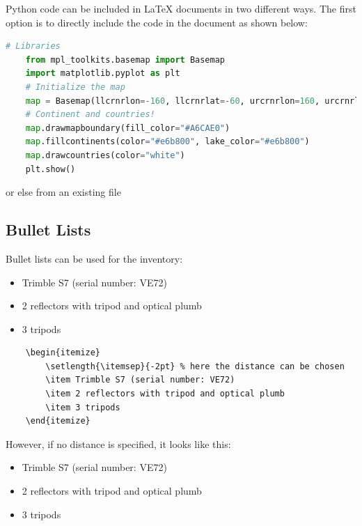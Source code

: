 Python code can be included in \LaTeX{} documents in two different ways. The first option is to directly include the code in the document as shown below:

\begin{lstlisting}[language=Python, style=Python, caption=Basemap-Anwendung, label={lst:basemap}]
	# Libraries
	from mpl_toolkits.basemap import Basemap
	import matplotlib.pyplot as plt
	# Initialize the map
	map = Basemap(llcrnrlon=-160, llcrnrlat=-60, urcrnrlon=160, urcrnrlat=70)
	# Continent and countries!
	map.drawmapboundary(fill_color="#A6CAE0")
	map.fillcontinents(color="#e6b800", lake_color="#e6b800")
	map.drawcountries(color="white")
	plt.show()
\end{lstlisting} 

or else from an existing file




\subsection{Bullet Lists}

Bullet lists can be used for the inventory:

\begin{itemize}	
	\setlength{\itemsep}{-2pt} %
	\item Trimble S7 (serial number: VE72)
	\item 2 reflectors with tripod and optical plumb
	\item 3 tripods
\end{itemize}

\begin{verbatim}
    \begin{itemize}	
    	\setlength{\itemsep}{-2pt} % here the distance can be chosen
    	\item Trimble S7 (serial number: VE72)
    	\item 2 reflectors with tripod and optical plumb
    	\item 3 tripods
    \end{itemize}
\end{verbatim}

However, if no distance is specified, it looks like this:

\begin{itemize}	
	\item Trimble S7 (serial number: VE72)
	\item 2 reflectors with tripod and optical plumb
	\item 3 tripods
\end{itemize}

